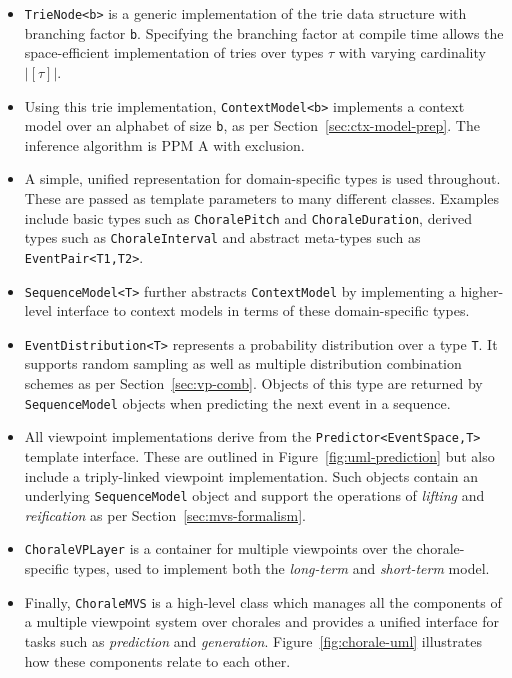 \documentclass[12pt,a4paper,twoside,openright]{report}
\begin{document}
\begin{itemize}
  \item \texttt{TrieNode<b>} is a generic implementation of the trie data
    structure with branching factor \texttt{b}. Specifying the branching factor
    at compile time allows the space-efficient implementation of tries over
    types $\tau$ with varying cardinality $|[\tau]|$.
  \item Using this trie implementation, \texttt{ContextModel<b>} implements a
    context model over an alphabet of size \texttt{b}, as per
    Section~\ref{sec:ctx-model-prep}. The inference algorithm is PPM A with
    exclusion.
  \item A simple, unified representation for domain-specific types is used
    throughout.  These are passed as template parameters to many different
    classes. Examples include basic types such as \texttt{ChoralePitch} and
    \texttt{ChoraleDuration}, derived types such as \texttt{ChoraleInterval} and
    abstract meta-types such as \texttt{EventPair<T1,T2>}.
  \item \texttt{SequenceModel<T>} further abstracts \texttt{ContextModel} by
    implementing a higher-level interface to context models in terms of these
    domain-specific types.
  \item \texttt{EventDistribution<T>} represents a probability distribution over
    a type \texttt{T}. It supports random sampling as well as multiple
    distribution combination schemes as per Section~\ref{sec:vp-comb}. Objects
    of this type are returned by \texttt{SequenceModel} objects when predicting
    the next event in a sequence.
  \item All viewpoint implementations derive from the
    \texttt{Predictor<EventSpace,T>} template interface. These are outlined in
    Figure~\ref{fig:uml-prediction} but also include a triply-linked viewpoint
    implementation. Such objects contain an underlying \texttt{SequenceModel}
    object and support the operations of \emph{lifting} and \emph{reification}
    as per Section~\ref{sec:mvs-formalism}.
  \item \texttt{ChoraleVPLayer} is a container for multiple viewpoints over
    the chorale-specific types, used to
    implement both the \emph{long-term} and \emph{short-term} model.
  \item Finally, \texttt{ChoraleMVS} is a high-level class which manages all the
    components of a multiple viewpoint system over chorales and provides a
    unified interface for tasks such as \emph{prediction} and \emph{generation}.
    Figure~\ref{fig:chorale-uml} illustrates how these components relate to each
    other.
\end{itemize}
\end{document}
